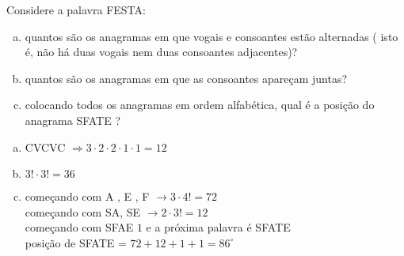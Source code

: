 \begin{ex}
Considere a palavra FESTA:
   \begin{enumerate}[(a)]
   \item quantos são os anagramas em que vogais e consoantes estão alternadas ( isto é, não há duas vogais nem duas consoantes adjacentes)?
   \item quantos são os anagramas em que as consoantes apareçam juntas?
   \item colocando todos os anagramas em ordem alfabética, qual é a posição do anagrama SFATE ?
   \end{enumerate}
     \begin{sol}
       \phantom{A}
        \begin{enumerate} [(a)]
            \item CVCVC $\Longrightarrow 3\cdot2\cdot2\cdot1\cdot1=12$
            \item $3!\cdot3!=36$
            \item começando com A , E , F $\rightarrow 3\cdot4!=72$\\
            começando com SA, SE $\rightarrow2\cdot3! =12$\\
            começando com SFAE $1$ e a próxima palavra é SFATE\\
            posição de SFATE = $72+12+1+1= 86^{\circ}$
            
        \end{enumerate}
     \end{sol}
\end{ex}